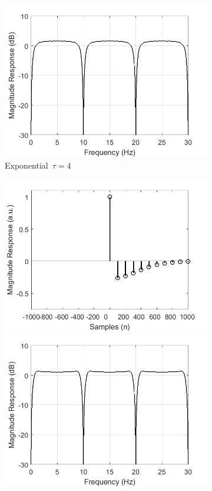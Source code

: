 \documentclass[a4paper]{article}
\begin{document}
\begin{figure}[hbtp]
\begin{subfigure}{.245\textwidth}
        \includegraphics[width=\textwidth]{img/causal/mag_exp.png}
        \caption{Exponential~$\tau=4$}\label{fig:ExponentialKernel}
    \end{subfigure}
    \begin{subfigure}{.245\textwidth}
        \includegraphics[width=\textwidth]{img/causal/kernel_gauss.png}\\
        \includegraphics[width=\textwidth]{img/causal/mag_gauss.png}

\end{subfigure}
\end{figure}
\end{document}
